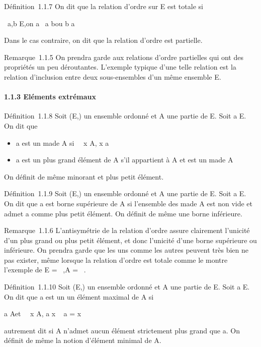 Définition~1.1.7 On dit que la relation d'ordre \leqslant sur E est totale si

\forall~a,b \in E,\text on a ~a \leqslant
b\text ou b \leqslant a

Dans le cas contraire, on dit que la relation d'ordre est partielle.

Remarque~1.1.5 On prendra garde aux relations d'ordre partielles qui ont
des propriétés un peu déroutantes. L'exemple typique d'une telle
relation est la relation d'inclusion entre deux sous-ensembles d'un même
ensemble E.

\paragraph{1.1.3 Eléments extrémaux}

Définition~1.1.8 Soit (E,\leqslant) un ensemble ordonné et A une partie de E.
Soit a \in E. On dit que

\begin{itemize}
\itemsep1pt\parskip0pt
\item
  a est un ma\jmathorant de A si \forall~~x \in A, x \leqslant a
\item
  a est un plus grand élément de A s'il appartient à A et est un
  ma\jmathorant de A
\end{itemize}

On définit de même minorant et plus petit élément.

Définition~1.1.9 Soit (E,\leqslant) un ensemble ordonné et A une partie de E.
Soit a \in E. On dit que a est borne supérieure de A si l'ensemble des
ma\jmathorants de A est non vide et admet a comme plus petit élément. On
définit de même une borne inférieure.

Remarque~1.1.6 L'antisymétrie de la relation d'ordre assure clairement
l'unicité d'un plus grand ou plus petit élément, et donc l'unicité d'une
borne supérieure ou inférieure. On prendra garde que les uns comme les
autres peuvent très bien ne pas exister, même lorsque la relation
d'ordre est totale comme le montre l'exemple de E = ~,A = ~.

Définition~1.1.10 Soit (E,\leqslant) un ensemble ordonné et A une partie de E.
Soit a \in E. On dit que a est un un élément maximal de A si

a \in A\text et \quad
\forall~~x \in A, a \leqslant x \rigtharrow~ a = x

autrement dit si A n'admet aucun élément strictement plus grand que a.
On définit de même la notion d'élément minimal de A.

